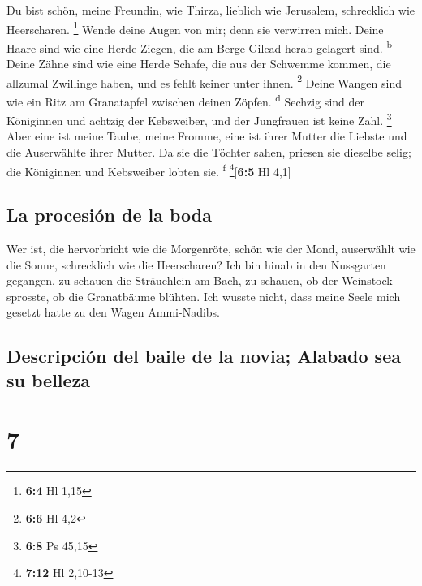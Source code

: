  Du bist schön, meine Freundin, wie Thirza, lieblich wie
Jerusalem, schrecklich wie Heerscharen. \footnote{\textbf{6:4} Hl 1,15}
 Wende deine Augen von mir; denn sie verwirren mich. Deine
Haare sind wie eine Herde Ziegen, die am Berge Gilead herab gelagert
sind. \textsuperscript{b}  Deine Zähne sind wie eine Herde
Schafe, die aus der Schwemme kommen, die allzumal Zwillinge haben, und
es fehlt keiner unter ihnen. \footnote{\textbf{6:6} Hl 4,2}
 Deine Wangen sind wie ein Ritz am Granatapfel zwischen
deinen Zöpfen. \textsuperscript{d}  Sechzig sind der
Königinnen und achtzig der Kebsweiber, und der Jungfrauen ist keine
Zahl. \footnote{\textbf{6:8} Ps 45,15}  Aber eine ist
meine Taube, meine Fromme, eine ist ihrer Mutter die Liebste und die
Auserwählte ihrer Mutter. Da sie die Töchter sahen, priesen sie dieselbe
selig; die Königinnen und Kebsweiber lobten sie. \textsuperscript{f}
\footnote{\textbf{7:12} Hl 2,10-13}{[}\textbf{6:5} Hl 4,1{]}

\hypertarget{la-procesiuxf3n-de-la-boda}{%
\subsection{La procesión de la boda}\label{la-procesiuxf3n-de-la-boda}}

 Wer ist, die hervorbricht wie die Morgenröte, schön wie
der Mond, auserwählt wie die Sonne, schrecklich wie die Heerscharen?
 Ich bin hinab in den Nussgarten gegangen, zu schauen die
Sträuchlein am Bach, zu schauen, ob der Weinstock sprosste, ob die
Granatbäume blühten.  Ich wusste nicht, dass meine Seele
mich gesetzt hatte zu den Wagen Ammi-Nadibs.

\hypertarget{descripciuxf3n-del-baile-de-la-novia-alabado-sea-su-belleza}{%
\subsection{Descripción del baile de la novia; Alabado sea su
belleza}\label{descripciuxf3n-del-baile-de-la-novia-alabado-sea-su-belleza}}

\hypertarget{section-6}{%
\section{7}\label{section-6}}

